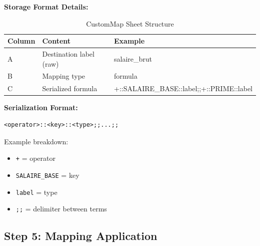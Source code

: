\textbf{Storage Format Details:}

\begin{table}[H]
\centering
\footnotesize
\begin{tabularx}{\textwidth}{lXl}
\toprule
\textbf{Column} & \textbf{Content} & \textbf{Example} \\
\midrule
A & Destination label (raw) & salaire\_brut \\
B & Mapping type & formula \\
C & Serialized formula & +::SALAIRE\_BASE::label;;+::PRIME::label \\
\bottomrule
\end{tabularx}
\caption{CustomMap Sheet Structure}
\end{table}

\textbf{Serialization Format:}
\begin{verbatim}
<operator>::<key>::<type>;;...;;
\end{verbatim}

Example breakdown:
\begin{itemize}
    \item \texttt{+} = operator
    \item \texttt{SALAIRE\_BASE} = key
    \item \texttt{label} = type
    \item \texttt{;;} = delimiter between terms
\end{itemize}

\subsection{Step 5: Mapping Application}

